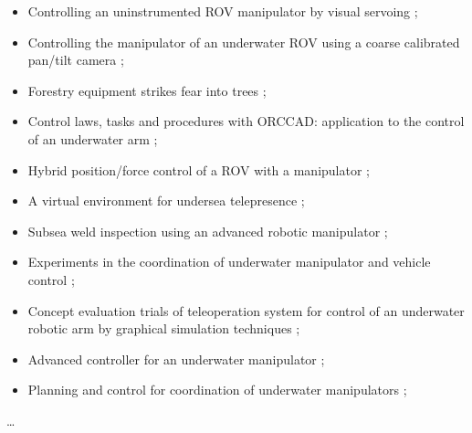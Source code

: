 \begin{itemize}
	\item Controlling an uninstrumented ROV manipulator by visual servoing \cite{marchand2001controlling};
	\item Controlling the manipulator of an underwater ROV using a coarse calibrated pan/tilt camera \cite{marchand2001controllingx};
	\item Forestry equipment strikes fear into trees \cite{heney2000features};
	\item Control laws, tasks and procedures with ORCCAD: application to the control of an underwater arm \cite{simon1998control};
	\item Hybrid position/force control of a ROV with a manipulator \cite{lapierre1998hybrid};
	\item A virtual environment for undersea telepresence \cite{schebor1995virtual};
	\item Subsea weld inspection using an advanced robotic manipulator \cite{broome1995subsea};
	\item Experiments in the coordination of underwater manipulator and vehicle control \cite{mclain1995experiments};
	\item Concept evaluation trials of teleoperation system for control of an underwater robotic arm by graphical simulation techniques \cite{boyle1995concept};
	\item Advanced controller for an underwater manipulator \cite{larkum1994advanced};
	\item Planning and control for coordination of underwater manipulators \cite{lane1991planning};
\end{itemize}


%



\ldots






